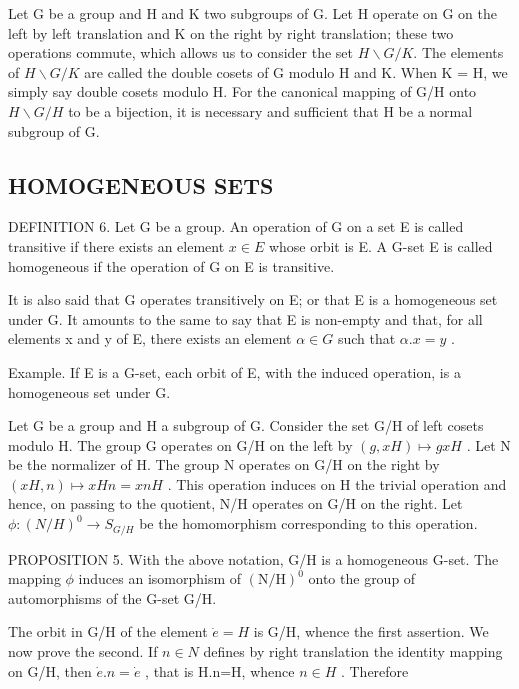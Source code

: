 Let G be a group and H and K two subgroups of G. Let H operate on G on the left by left translation and K on the right by right translation; these two operations commute, which allows us to consider the set \(H\backslash G/K\). The elements of \(H\backslash G/K\) are called the double cosets of G modulo H and K. When K = H, we simply say double cosets modulo H. For the canonical mapping of G/H onto \(H\backslash G/H\) to be a bijection, it is necessary and sufficient that H be a normal subgroup of G.

\subsection{HOMOGENEOUS SETS}

DEFINITION 6. Let G be a group. An operation of G on a set E is called transitive if there exists an element \(x \in E\) whose orbit is E. A G-set E is called homogeneous if the operation of G on E is transitive.

It is also said that G operates transitively on E; or that E is a homogeneous set under G. It amounts to the same to say that E is non-empty and that, for all elements x and y of E, there exists an element \(\alpha \in G\) such that \(\alpha.x = y\) .

Example. If E is a G-set, each orbit of E, with the induced operation, is a homogeneous set under G.

Let G be a group and H a subgroup of G. Consider the set G/H of left cosets modulo H. The group G operates on G/H on the left by \((g, xH) \mapsto gxH\) . Let N be the normalizer of H. The group N operates on G/H on the right by \((xH, n) \mapsto xHn = xnH\) . This operation induces on H the trivial operation and hence, on passing to the quotient, N/H operates on G/H on the right. Let \(\phi: (N/H)^{0} \to S_{G/H}\) be the homomorphism corresponding to this operation.

PROPOSITION 5. With the above notation, G/H is a homogeneous G-set. The mapping \(\phi\) induces an isomorphism of \((\mathrm{N} / \mathrm{H})^0\) onto the group of automorphisms of the G-set G/H.

The orbit in G/H of the element \(\dot{e}=H\) is G/H, whence the first assertion. We now prove the second. If \(n\in N\) defines by right translation the identity mapping on G/H, then \(\dot{e}.n=\dot{e}\) , that is H.n=H, whence \(n\in H\) . Therefore

